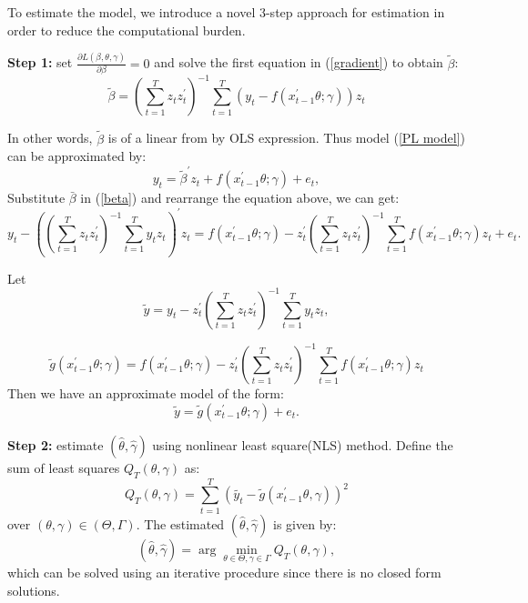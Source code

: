 \documentclass[a4paper,12pt,times,numbered,print,index]{report}
\numberwithin{equation}{section}
\begin{document}
To estimate the model, we introduce a novel 3-step approach for estimation in order to reduce the computational burden. 

\textbf{Step 1:} set $\frac{\partial L(\beta, \theta, \gamma)}{\partial \beta} = 0$ and solve the first equation in (\ref{gradient}) to obtain $\tilde{\beta}$:
\begin{equation}
\tilde{\beta} = \left( \sum_{t=1}^{T}z_t z_t^{\prime}\right)^{-1}\sum_{t=1}^{T}\left( y_t - f\left( x_{t-1}^{\prime }\theta; \gamma\right)\right) z_t
\label{beta}
\end{equation}

In other words, $\tilde{\beta}$ is of a linear from by OLS expression. Thus model (\ref{PL model}) can be approximated by:
$$
y_t = \tilde{\beta}^{\prime} z_t + f\left( x_{t-1}^{\prime }\theta; \gamma\right) +e_{t},
$$
Substitute $\bar{\beta}$ in (\ref{beta}) and rearrange the equation above, we can get:
$$
y_t - \left( \left( \sum_{t=1}^{T}z_t z_t^{\prime}\right)^{-1} \sum_{t=1}^{T}y_t z_t \right) ^{\prime} z_t = f\left( x_{t-1}^{\prime }\theta; \gamma\right) - z_t^{\prime} \left( \sum_{t=1}^{T}z_t z_t^{\prime}\right)^{-1} \sum_{t=1}^{T} f\left( x_{t-1}^{\prime }\theta; \gamma\right) z_t + e_t.
$$

Let  
$$\tilde{y} = y_t -  z_t^{\prime}  \left( \sum_{t=1}^{T}z_t z_t^{\prime}\right)^{-1} \sum_{t=1}^{T}y_t z_t, $$ 

$$\tilde{g} ( x_{t-1}^{\prime }\theta; \gamma) = f\left( x_{t-1}^{\prime }\theta; \gamma\right) - z_t^{\prime} \left( \sum_{t=1}^{T}z_t z_t^{\prime}\right)^{-1} \sum_{t=1}^{T} f\left( x_{t-1}^{\prime }\theta; \gamma\right) z_t$$ 
Then we have an approximate model of the form:
\begin{equation}
\tilde{y} = \tilde{g}\left( x_{t-1}^{\prime }\theta; \gamma\right) + e_t.
\label{trans_model}
\end{equation}

\textbf{Step 2: } estimate $(\hat{\theta}, \hat{\gamma})$ using nonlinear least square(NLS) method. Define the sum of least squares $Q_{T}(\theta, \gamma)$ as:
$$
Q_{T}(\theta, \gamma)=\sum_{t=1}^{T}\left(\tilde{y_{t}}-\tilde{g}\left(x_{t-1}^{\prime} \theta, \gamma\right)\right)^{2}
$$
over $(\theta, \gamma) \in (\Theta, \Gamma)$.
The estimated $(\hat{\theta}, \hat{\gamma})$ is given by:
\begin{equation*}
\left( \widehat{\theta},\widehat{\gamma}\right) =\arg \min_{\theta \in \Theta
	,\gamma \in \Gamma }Q_{T}\left( \theta ,\gamma \right),  \label{nls_c3}
\end{equation*}%
which can be solved using an iterative procedure since there is no closed form solutions. 
\end{document}
